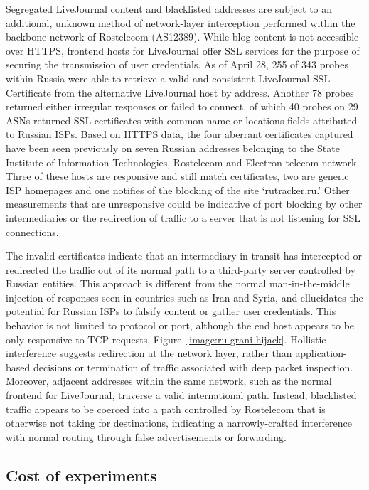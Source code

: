 Segregated LiveJournal content and blacklisted addresses are subject to an
additional, unknown method of network-layer interception performed within the
backbone network of Rostelecom (AS12389). While blog content is not
accessible over HTTPS, frontend hosts for LiveJournal offer SSL services for the purpose of
securing the transmission of user credentials. As of April 28, 255 of 343
probes within Russia were able to retrieve a valid and consistent LiveJournal
SSL Certificate from the alternative LiveJournal host by address. Another 78
probes returned either irregular responses or failed to connect, of which 40
probes on 29 ASNs returned SSL certificates with common name or locations
fields attributed to Russian ISPs. Based on HTTPS data, the four aberrant
certificates captured have been seen previously on seven Russian addresses
belonging to the State Institute of Information Technologies, Rostelecom and
Electron telecom network. Three of these hosts are responsive and still match
certificates, two are generic ISP homepages and one notifies of the blocking of
the site `rutracker.ru.' Other measurements that are unresponsive could be
indicative of port blocking by other intermediaries or the redirection of
traffic to a server that is not listening for SSL connections.

The invalid certificates indicate that an intermediary in transit has
intercepted or redirected the traffic out of its normal path to a third-party
server controlled by Russian entities. This approach is different from the
normal man-in-the-middle injection of responses seen in countries such as Iran and Syria, and
ellucidates the potential for Russian ISPs to falsify content or gather user
credentials. This behavior is not limited to protocol or port, although the end
host appears to be only responsive to TCP requests,
Figure~\ref{image:ru-grani-hijack}. Hollistic interference suggests
redirection at the network layer, rather than application-based decisions or
termination of traffic associated with deep packet inspection. Moreover,
adjacent addresses within the same network, such as the normal frontend for
LiveJournal, traverse a valid international path. Instead, blacklisted traffic
appears to be coerced into a path controlled by Rostelecom that is otherwise
not taking for destinations, indicating a narrowly-crafted interference with
normal routing through false advertisements or forwarding.

\subsection{Cost of experiments}
